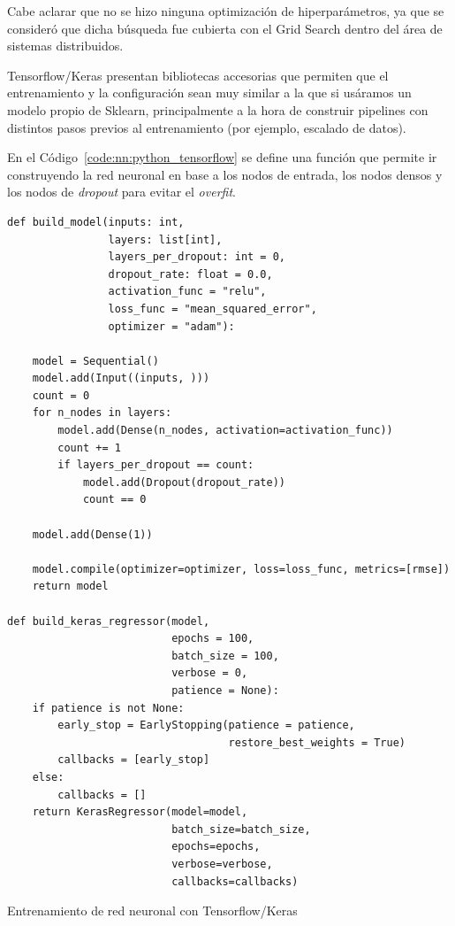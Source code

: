 \documentclass[11pt]{article}
\newcommand{\english}[1]{\textit{#1}}
\begin{document}
Cabe aclarar que no se hizo ninguna optimización de hiperparámetros, ya que se consideró que dicha búsqueda fue cubierta con el Grid Search dentro del área de sistemas distribuidos.

Tensorflow/Keras presentan bibliotecas accesorias que permiten que el entrenamiento y la configuración sean muy similar a la que si usáramos un modelo propio de Sklearn, principalmente a la hora de construir pipelines con distintos pasos previos al entrenamiento (por ejemplo, escalado de datos).

En el Código~\ref{code:nn:python_tensorflow} se define una función que permite ir construyendo la red neuronal en base a los nodos de entrada, los nodos densos y los nodos de \english{dropout} para evitar el \english{overfit}.

\begin{listing}
\begin{verbatim}
def build_model(inputs: int,
                layers: list[int],
                layers_per_dropout: int = 0,
                dropout_rate: float = 0.0,
                activation_func = "relu",
                loss_func = "mean_squared_error",
                optimizer = "adam"):
    
    model = Sequential()
    model.add(Input((inputs, )))
    count = 0
    for n_nodes in layers:
        model.add(Dense(n_nodes, activation=activation_func))
        count += 1
        if layers_per_dropout == count:
            model.add(Dropout(dropout_rate))
            count == 0

    model.add(Dense(1))
    
    model.compile(optimizer=optimizer, loss=loss_func, metrics=[rmse])
    return model

def build_keras_regressor(model,
                          epochs = 100,
                          batch_size = 100,
                          verbose = 0,
                          patience = None):
    if patience is not None:
        early_stop = EarlyStopping(patience = patience,
                                   restore_best_weights = True)
        callbacks = [early_stop]
    else:
        callbacks = []
    return KerasRegressor(model=model,
                          batch_size=batch_size,
                          epochs=epochs,
                          verbose=verbose,
                          callbacks=callbacks)
\end{verbatim}
\caption{Entrenamiento de red neuronal con Tensorflow/Keras}
\label{code:nn:python_tensorflow}
\end{listing}
\end{document}
